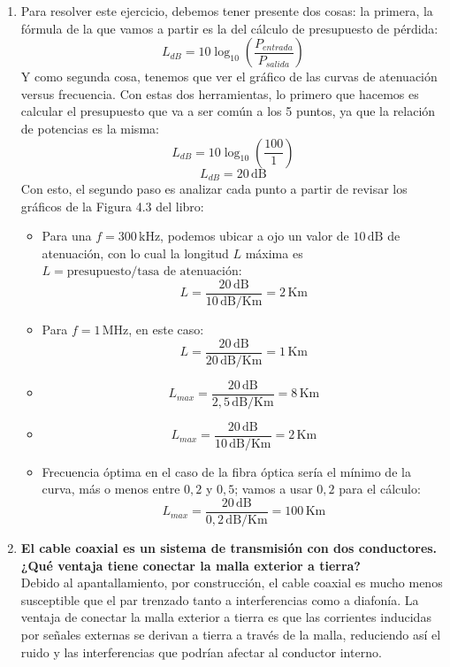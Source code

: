 \documentclass[11pt,a4paper]{article}
\begin{document}
\begin{enumerate}[label=4.\arabic*), itemsep=0.3cm]
  \item
        Para resolver este ejercicio, debemos tener presente dos cosas: la primera, la fórmula de la que vamos a partir es la del cálculo de presupuesto de pérdida:
        \[
          L_{dB} = 10\log_{10}\left(\frac{P_{entrada}}{P_{salida}}\right)
        \]
        Y como segunda cosa, tenemos que ver el gráfico de las curvas de atenuación versus frecuencia. Con estas dos herramientas, lo primero que hacemos es calcular el presupuesto que va a ser común a los 5 puntos, ya que la relación de potencias es la misma:
        \[
          L_{dB} = 10\log_{10}\left(\frac{100}{1}\right)
        \]
        \[
          L_{dB} = 20\,\mathrm{dB}
        \]
        Con esto, el segundo paso es analizar cada punto a partir de revisar los gráficos de la Figura 4.3 del libro:
        \begin{itemize}
          \item[a)] Para una $f = 300\,\mathrm{kHz}$, podemos ubicar a ojo un valor de $10\,\mathrm{dB}$ de atenuación, con lo cual la longitud $L$ máxima es $L = \text{presupuesto}/\text{tasa de atenuación}$:
                \[
                  L = \frac{20\,\mathrm{dB}}{10\,\mathrm{dB/Km}} = 2\,\mathrm{Km}
                \]
          \item[b)] Para $f = 1\,\mathrm{MHz}$, en este caso:
                \[
                  L = \frac{20\,\mathrm{dB}}{20\,\mathrm{dB/Km}} = 1\,\mathrm{Km}
                \]
          \item[c)]
                \[
                  L_{max} = \frac{20\,\mathrm{dB}}{2,5\,\mathrm{dB/Km}} = 8\,\mathrm{Km}
                \]
          \item[d)]
                \[
                  L_{max} = \frac{20\,\mathrm{dB}}{10\,\mathrm{dB/Km}} = 2\,\mathrm{Km}
                \]
          \item[e)] Frecuencia óptima en el caso de la fibra óptica sería el mínimo de la curva, más o menos entre $0,2$ y $0,5$; vamos a usar $0,2$ para el cálculo:
                \[
                  L_{max} = \frac{20\,\mathrm{dB}}{0,2\,\mathrm{dB/Km}} = 100\,\mathrm{Km}
                \]
        \end{itemize}

  \item
        \textbf{El cable coaxial es un sistema de transmisión con dos conductores. ¿Qué ventaja tiene conectar la malla exterior a tierra?} \\
        Debido al apantallamiento, por construcción, el cable coaxial es mucho menos susceptible que el par trenzado tanto a interferencias como a diafonía. La ventaja de conectar la malla exterior a tierra es que las corrientes inducidas por señales externas se derivan a tierra a través de la malla, reduciendo así el ruido y las interferencias que podrían afectar al conductor interno.


\end{enumerate}
\end{document}
